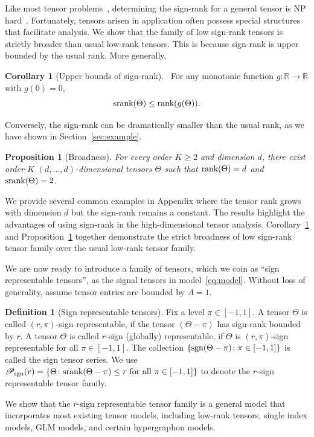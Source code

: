\documentclass{article}
\theoremstyle{plain}
\newtheorem{prop}{Proposition}
\theoremstyle{definition}
\newtheorem{defn}{Definition}
\newtheorem{cor}{Corollary}
\def\sign{\textup{sgn}}
\def\srank{\textup{srank}}
\def\rank{\textup{rank}}
\def\caliP{\mathscr{P}_{\textup{sgn}}}
\begin{document}
Like most tensor problems~\cite{hillar2013most}, determining the sign-rank for a general tensor is NP hard~\cite{alon2016sign}. Fortunately, tensors arisen in application often possess special structures that facilitate analysis. We show that the family of low sign-rank tensors is strictly broader than usual low-rank tensors. This is because sign-rank is upper bounded by the usual rank. More generally, 
\begin{cor}[Upper bounds of sign-rank]~\label{cor:monotonic} For any monotonic function $g\colon \mathbb{R}\to \mathbb{R}$ with $g(0)=0$, 
\[
\textup{srank}(\Theta)\leq\rank(g(\Theta)).
\]
\end{cor}
Conversely, the sign-rank can be dramatically smaller than the usual rank, as we have shown in Section~\ref{sec:example}.
\begin{prop}[Broadness]\label{prop:extention}For every order $K\geq 2$ and dimension $d$, there exist order-$K$ $(d,\ldots,d)$-dimensional tensors $\Theta$ such that $\rank(\Theta)=d$ and $\srank(\Theta)=2$.
\end{prop}
We provide several common examples in Appendix where the tensor rank grows with dimension $d$ but the sign-rank remains a constant. The results highlight the advantages of using sign-rank in the high-dimensional tensor analysis. Corollary~\ref{cor:monotonic} and Proposition~\ref{prop:extention} together demonstrate the strict broadness of low sign-rank tensor family over the usual low-rank tensor family. 

We are now ready to introduce a family of tensors, which we coin as ``sign representable tensors'', as the signal tensors in model~\eqref{eq:model}. 
Without loss of generality, assume tensor entries are bounded by $A=1$. 
\begin{defn}[Sign representable tensors] 
Fix a level $\pi\in[-1,1]$. A tensor $\Theta$ is called $(r,\pi)$-sign representable, if the tensor $(\Theta-\pi)$ has sign-rank bounded by $r$. A tensor $\Theta$ is called $r$-sign (globally) representable, if $\Theta$ is $(r,\pi)$-sign representable for all $\pi\in[-1,1]$. The collection $\{\sign(\Theta-\pi)\colon \pi \in[-1,1]\}$ is called the sign tensor series. 
We use $\caliP(r)=\{\Theta\colon \srank(\Theta-\pi)\leq r \text{ for all }\pi\in[-1,1]\}$ to denote the $r$-sign representable tensor family.
\end{defn}
We show that the $r$-sign representable tensor family is a general model that incorporates most existing tensor models, including low-rank tensors, single index models, GLM models, and certain hypergraphon models. 
\end{document}

